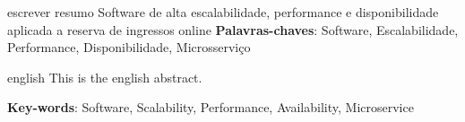 \setlength{\absparsep}{18pt} %
\begin{resumo}

  escrever resumo
Software de alta escalabilidade, performance e disponibilidade aplicada a reserva de ingressos online
  \textbf{Palavras-chaves}: Software, Escalabilidade, Performance, Disponibilidade, Microsserviço

\end{resumo}

\begin{resumo}[Abstract]
 \begin{otherlanguage*}{english}
   This is the english abstract.

   \vspace{\onelineskip}

   \noindent
   \textbf{Key-words}: Software, Scalability, Performance, Availability, Microservice
 \end{otherlanguage*}
\end{resumo}
